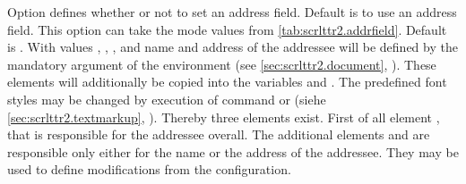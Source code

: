\begin{Declaration}
\end{Declaration}%
%
\BeginIndexGroup
{}%
%
%
Option  defines whether or not to set an address
field. Default is to use an address field. This option can take the mode
values from
\autoref{tab:scrlttr2.addrfield}. Default
is . With values ,
, , and
 name and address of the addressee will be defined by
the mandatory argument of the  environment (see
\autoref{sec:scrlttr2.document},
). These elements will additionally be
copied into the variables  and .  The
predefined font styles may be changed by
execution of command  or  (siehe
\autoref{sec:scrlttr2.textmarkup},
). Thereby three elements
exist. First of all element
, that is
responsible for the addressee overall. The additional elements
 and
 are responsible
only either for the name or the address of the addressee. They may be used to
define modifications from the  configuration.%
\EndIndexGroup

